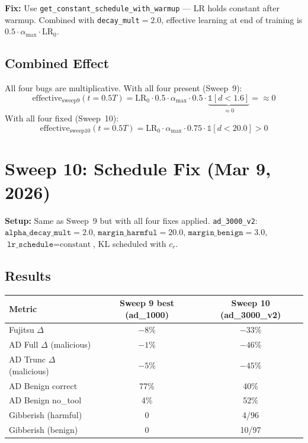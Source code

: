 \documentclass[11pt]{article}
\newcommand{\good}[1]{\textcolor{good}{#1}}
\newcommand{\bad}[1]{\textcolor{bad}{#1}}
\begin{document}
\textbf{Fix:} Use \texttt{get\_constant\_schedule\_with\_warmup} --- LR holds
constant after warmup. Combined with \texttt{decay\_mult}$=2.0$, effective
learning at end of training is $0.5 \cdot \alpha_{\max} \cdot \mathrm{LR}_0$.

\subsection{Combined Effect}

All four bugs are multiplicative. With all four present (Sweep~9):
\begin{equation}
  \text{effective}_{\text{sweep9}}(t=0.5T) = \mathrm{LR}_0 \cdot 0.5 \cdot \alpha_{\max} \cdot 0.5 \cdot \underbrace{\mathbb{1}[d < 1.6]}_{\approx 0} = \approx 0
\end{equation}
With all four fixed (Sweep~10):
\begin{equation}
  \text{effective}_{\text{sweep10}}(t=0.5T) = \mathrm{LR}_0 \cdot \alpha_{\max} \cdot 0.75 \cdot \mathbb{1}[d < 20.0] > 0
\end{equation}

\section{Sweep 10: Schedule Fix (Mar 9, 2026)}

\textbf{Setup:} Same as Sweep~9 but with all four fixes applied.
\texttt{ad\_3000\_v2}: $\texttt{alpha\_decay\_mult}=2.0$,
$\texttt{margin\_harmful}=20.0$, $\texttt{margin\_benign}=3.0$,
$\texttt{lr\_schedule}=\text{constant}$, KL scheduled with $c_r$.

\subsection{Results}

\begin{center}
\begin{tabular}{lcc}
\toprule
Metric & Sweep 9 best (ad\_1000) & Sweep 10 (ad\_3000\_v2) \\
\midrule
Fujitsu $\Delta$ & $-8\%$ & \good{$-33\%$} \\
AD Full $\Delta$ (malicious) & $-1\%$ & \good{$-46\%$} \\
AD Trunc $\Delta$ (malicious) & $-5\%$ & \good{$-45\%$} \\
AD Benign correct & 77\% & \bad{40\%} \\
AD Benign no\_tool & 4\% & \bad{52\%} \\
Gibberish (harmful) & 0 & 4/96 \\
Gibberish (benign) & 0 & \bad{10/97} \\
\bottomrule
\end{tabular}
\end{center}
\end{document}
